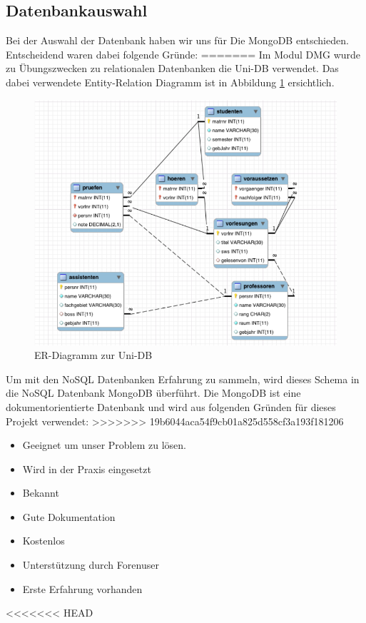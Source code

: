 \subsection{Datenbankauswahl}
Bei der Auswahl der Datenbank haben wir uns für Die MongoDB entschieden. Entscheidend waren dabei folgende Gründe:
=======
Im Modul DMG wurde zu Übungszwecken zu relationalen Datenbanken die Uni-DB 
verwendet. Das dabei verwendete Entity-Relation Diagramm ist in Abbildung
\ref{fig:uni-db} ersichtlich.
\begin{figure}[htbp] 
  \centering
     \includegraphics[width=1\textwidth]{./pictures/SQL-DB_ER_Diagramm_UNI-DB.png}
  \caption{ER-Diagramm zur Uni-DB \cite{Kaufmann2016_S1}}
  \label{fig:uni-db}
\end{figure}
 Um mit den NoSQL Datenbanken Erfahrung zu sammeln, wird dieses Schema in die NoSQL Datenbank MongoDB überführt.
Die MongoDB ist eine dokumentorientierte Datenbank und  wird aus folgenden
Gründen für dieses Projekt verwendet:
>>>>>>> 19b6044aca54f9cb01a825d558cf3a193f181206
\begin{itemize}
  \item Geeignet um unser Problem zu lösen.
  \item Wird in der Praxis eingesetzt
  \item Bekannt
  \item Gute Dokumentation
  \item Kostenlos
  \item Unterstützung durch Forenuser
  \item Erste Erfahrung vorhanden
\end{itemize}
<<<<<<< HEAD

